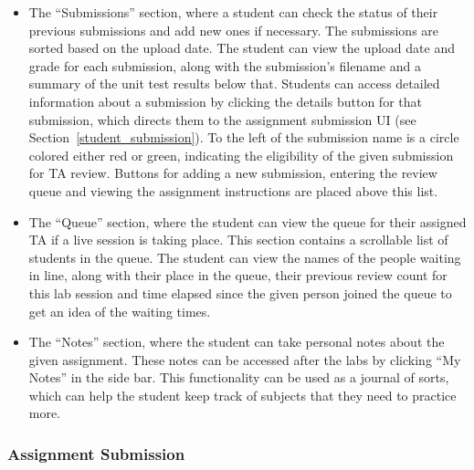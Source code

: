 \documentclass[a4paper, 12pt]{article}
\begin{document}
    \begin{itemize}
      \item The ``Submissions'' section, where a student can check the status of their previous submissions and add new ones if necessary.
            The submissions are sorted based on the upload date. The student can view the upload date and grade for each submission,
            along with the submission's filename and a summary of the unit test results below that. Students can access detailed
            information about a submission by clicking the details button for that submission, which directs them to the
            assignment submission UI (see Section~\ref{student_submission}). To the left of the submission name is a circle colored either red or
            green, indicating the eligibility of the given submission for TA review. Buttons for adding a new submission, entering the
            review queue and viewing the assignment instructions are placed above this list.
      \item The ``Queue'' section, where the student can view the queue for their assigned TA if a live session is taking place. This section
            contains a scrollable list of students in the queue. The student can view the names of the people waiting in line, along with their
            place in the queue, their previous review count for this lab session and time elapsed since the given person joined the queue to get an idea
            of the waiting times.
      \item The ``Notes'' section, where the student can take personal notes about the given assignment. These notes can be accessed
            after the labs by clicking ``My Notes'' in the side bar. This functionality can be used as a journal of sorts, which can
            help the student keep track of subjects that they need to practice more.
    \end{itemize}

    \pagebreak

    \subsubsection{Assignment Submission}~\label{student_submission}
\end{document}
